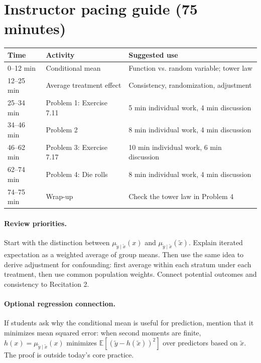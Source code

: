 \documentclass[11pt]{article}
\newcommand{\E}{\mathbb{E}}
\newcommand{\rv}[1]{\widetilde{#1}}
\begin{document}
\section*{Instructor pacing guide (75 minutes)}
\begin{center}
\begin{tabular}{@{}lll@{}}
\toprule
Time & Activity & Suggested use\\
\midrule
0--12 min & Conditional mean & Function vs. random variable; tower law\\
12--25 min & Average treatment effect & Consistency, randomization, adjustment\\
25--34 min & Problem 1: Exercise 7.11 & 5 min individual work, 4 min discussion\\
34--46 min & Problem 2 & 8 min individual work, 4 min discussion\\
46--62 min & Problem 3: Exercise 7.17 & 10 min individual work, 6 min discussion\\
62--74 min & Problem 4: Die rolls & 8 min individual work, 4 min discussion\\
74--75 min & Wrap-up & Check the tower law in Problem 4\\
\bottomrule
\end{tabular}
\end{center}

\paragraph{Review priorities.}
Start with the distinction between
$\mu_{\rv{y}\mid\rv{x}}(x)$ and
$\mu_{\rv{y}\mid\rv{x}}(\rv{x})$.
Explain iterated expectation as a weighted average of group means.
Then use the same idea to derive adjustment for confounding: first average
within each stratum under each treatment, then use common population weights.
Connect potential outcomes and consistency to Recitation 2.

\paragraph{Optional regression connection.}
If students ask why the conditional mean is useful for prediction, mention
that it minimizes mean squared error: when second moments are finite,
$h(x)=\mu_{\rv{y}\mid\rv{x}}(x)$ minimizes
$\E[(\rv{y}-h(\rv{x}))^2]$ over predictors based on $\rv{x}$.
The proof is outside today's core practice.
\end{document}
